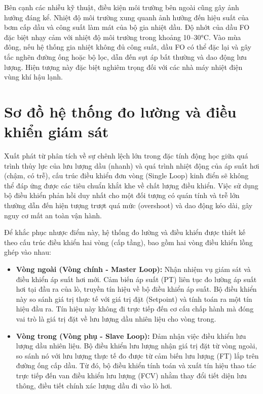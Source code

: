 \documentclass[../main.tex]{subfiles}
\begin{document}
Bên cạnh các nhiễu kỹ thuật, điều kiện môi trường bên ngoài cũng gây ảnh hưởng đáng kể. Nhiệt độ môi trường xung quanh ảnh hưởng đến hiệu suất của bơm cấp dầu và công suất làm mát của bộ gia nhiệt dầu. Độ nhớt của dầu FO đặc biệt nhạy cảm với nhiệt độ môi trường trong khoảng 10--30°C. Vào mùa đông, nếu hệ thống gia nhiệt không đủ công suất, dầu FO có thể đặc lại và gây tắc nghẽn đường ống hoặc bộ lọc, dẫn đến sụt áp bất thường và dao động lưu lượng. Hiện tượng này đặc biệt nghiêm trọng đối với các nhà máy nhiệt điện vùng khí hậu lạnh.

\section{Sơ đồ hệ thống đo lường và điều khiển giám sát}

Xuất phát từ phân tích về sự chênh lệch lớn trong đặc tính động học giữa quá trình thủy lực của lưu lượng dầu (nhanh) và quá trình nhiệt động của áp suất hơi (chậm, có trễ), cấu trúc điều khiển đơn vòng (Single Loop) kinh điển sẽ không thể đáp ứng được các tiêu chuẩn khắt khe về chất lượng điều khiển. Việc sử dụng bộ điều khiển phản hồi duy nhất cho một đối tượng có quán tính và trễ lớn thường dẫn đến hiện tượng trượt quá mức (overshoot) và dao động kéo dài, gây nguy cơ mất an toàn vận hành.

Để khắc phục nhược điểm này, hệ thống đo lường và điều khiển được thiết kế theo cấu trúc điều khiển hai vòng (cấp tầng), bao gồm hai vòng điều khiển lồng ghép vào nhau:
\begin{itemize}
    \item \textbf{Vòng ngoài (Vòng chính - Master Loop):} Nhận nhiệm vụ giám sát và điều khiển áp suất hơi mới. Cảm biến áp suất (PT) liên tục đo lường áp suất hơi tại đầu ra của lò, truyền tín hiệu về bộ điều khiển áp suất. Bộ điều khiển này so sánh giá trị thực tế với giá trị đặt (Setpoint) và tính toán ra một tín hiệu đầu ra. Tín hiệu này không đi trực tiếp đến cơ cấu chấp hành mà đóng vai trò là giá trị đặt về lưu lượng dầu nhiên liệu cho vòng trong.
    \item \textbf{Vòng trong (Vòng phụ - Slave Loop):} Đảm nhận việc điều khiển lưu lượng dầu nhiên liệu. Bộ điều khiển lưu lượng nhận giá trị đặt từ vòng ngoài, so sánh nó với lưu lượng thực tế đo được từ cảm biến lưu lượng (FT) lắp trên đường ống cấp dầu. Từ đó, bộ điều khiển tính toán và xuất tín hiệu thao tác trực tiếp đến van điều khiển lưu lượng (FCV) nhằm thay đổi tiết diện lưu thông, điều tiết chính xác lượng dầu đi vào lò hơi.
\end{itemize}
\end{document}
